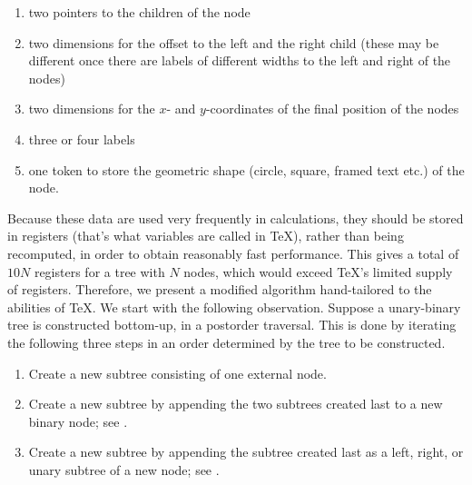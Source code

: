 \begin{enumerate}                                                               
\item two pointers to the children of the node                                  
\item two dimensions for the offset to the left and the right child (these      
      may be different once there are labels of different widths to the         
      left and right of the nodes)                                              
\item two dimensions for the $x$- and $y$-coordinates of the final              
      position of the nodes                                                     
\item three or four labels                                                      
\item one token to store the geometric shape (circle, square, framed text etc.)
      of the node.                       
\end{enumerate}                                                                 
                                                                                
Because these data are used very frequently in calculations, they should be     
stored in registers (that's what variables are called in \TeX),
rather than being recomputed, in order to obtain           
reasonably fast performance. This gives a total of $10N$ registers for          
a tree with $N$ nodes, which would exceed                                                          
\TeX's limited supply of registers. Therefore, we present a
modified algorithm hand-tailored to the abilities of \TeX{}.
We start with the following observation.                   
Suppose a unary-binary tree is constructed bottom-up, in a postorder            
traversal. This is done by iterating the following three steps in               
an order determined by the tree to be constructed.                              
                                                                                
\begin{enumerate}                                                               
\item Create a new subtree consisting of one external node.                     
\item Create a new subtree by appending the two subtrees created last           
      to a new binary node; see .                               
\item Create a new subtree by appending the subtree created last as a left,     
      right, or unary subtree of a new node; see .              
\end{enumerate}                                                                 
                                                                                

